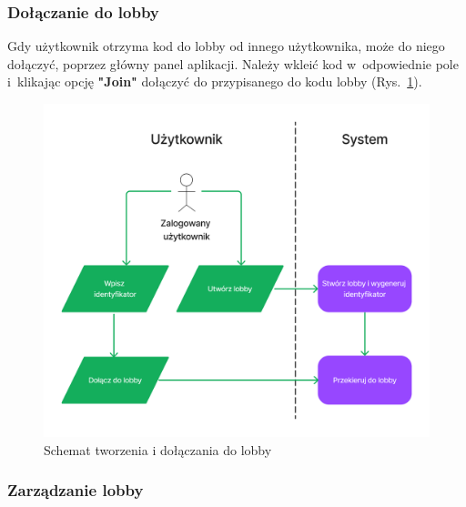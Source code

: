 \subsubsection{Dołączanie do lobby}

Gdy użytkownik otrzyma kod do lobby od innego użytkownika, może
do niego dołączyć, poprzez główny panel aplikacji. Należy wkleić
kod w~odpowiednie pole i~klikając opcję \textbf{"Join"}
dołączyć do przypisanego do kodu lobby (Rys.~\ref{fig:schemat_create_join_lobby}).

\begin{figure}[h]
  \centering
  \includegraphics[width=\textwidth]{img/schematy/create_join_lobby.png}
  \caption{Schemat tworzenia i dołączania do lobby}
  \label{fig:schemat_create_join_lobby}
\end{figure}

\FloatBarrier

\subsubsection{Zarządzanie lobby}

